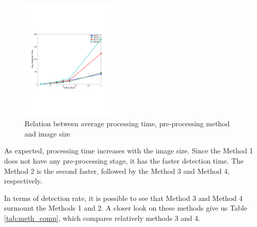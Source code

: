 \documentclass[conference, letterpaper]{IEEEtran}
\begin{document}
\begin{figure}[!ht]
	\centering
    \includegraphics[width=0.4\textwidth, trim={1.6cm 6.9cm 2.3cm 6.7cm}]{./fig/detection_time.pdf}
    \caption{Relation between average processing time, pre-processing method and image size}
	\label{fig:processing_time}
\end{figure}

As expected, processing time increases with the image size.  Since the Method 1
does not have any pre-processing stage, it has the faster detection time. The
Method 2 is the second faster, followed by the Method 3 and Method 4,
respectively. 

In terms of detection rate, it is possible to see that Method 3 and Method 4
surmount the Methods 1 and 2.  A closer look on these methods give us Table
\ref{tab:meth_comp}, which compares relatively methods 3 and 4.
\end{document}

